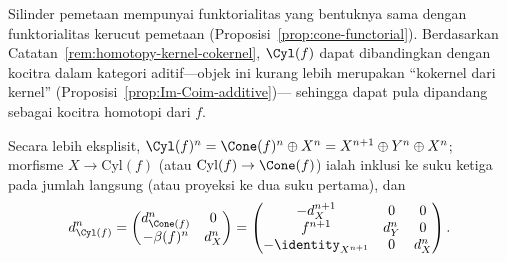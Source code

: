 Silinder pemetaan mempunyai funktorialitas yang bentuknya sama dengan
funktorialitas kerucut pemetaan (Proposisi~\ref{prop:cone-functorial}).
Berdasarkan Catatan~\ref{rem:homotopy-kernel-cokernel}, $\Cyl(f)$ dapat
dibandingkan dengan kocitra dalam kategori aditif---objek ini kurang lebih
merupakan ``kokernel dari kernel'' (Proposisi~\ref{prop:Im-Coim-additive})---
sehingga dapat pula dipandang sebagai kocitra homotopi dari $f$.

Secara lebih eksplisit,
$\Cyl(f)^n=\Cone(f)^n\oplus X^n=X^{n+1}\oplus Y^n\oplus X^n$; morfisme
$X\to\mathrm{Cyl}(f)$ (atau $\mathrm{Cyl}(f)\to\Cone(f)$) ialah inklusi ke
suku ketiga pada jumlah langsung (atau proyeksi ke dua suku pertama), dan
\[ d_{\Cyl(f)}^n =
	\begin{pmatrix} d_{\Cone(f)}^n & 0 \\ -\beta(f)^n & d_X^n \end{pmatrix}
	= \begin{pmatrix}
		-d_X^{n+1} & 0 & 0 \\
		f^{n+1} & d_Y^n & 0 \\
		-\identity_{X^{n+1}} & 0 & d_X^n
\end{pmatrix} .\]

